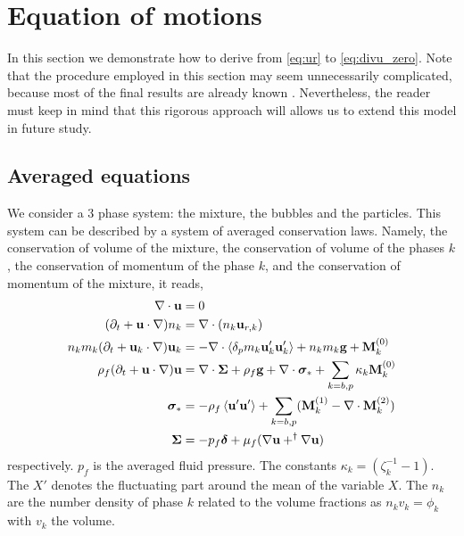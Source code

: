 \section{Equation of motions}
\label{sec:averaged_equations}
In this section we demonstrate how to derive from \ref{eq:ur} to \ref{eq:divu_zero}. 
Note that the procedure employed in this section may seem unnecessarily complicated, because most of the final results are already known \citep{jackson2000}. 
Nevertheless, the reader must keep in mind that this rigorous approach will allows us to extend this model in future study. 

\subsection{Averaged equations}

We consider a 3 phase system: the mixture, the bubbles and the particles.
This system can be described by a system of averaged conservation laws.
Namely, the conservation of volume of the mixture, the conservation of volume of the phases $k$, the conservation of momentum of the phase $k$, and the conservation of momentum of the mixture, it reads, 
\begin{align}
    \div \textbf{u} &= 0\\
     (\pddt + \textbf{u} \cdot \grad) n_k &= \div (n_k \textbf{u}_{r,k})\\
    n_k m_k (\pddt + \textbf{u}_k \cdot \grad) \textbf{u}_k &= 
    - \div \pavg{m_k\textbf{u}_k'\textbf{u}_k'}+n_k m_k \textbf{g}
    +\textbf{M}_k^{(0)}
    \label{eq:u_k}
    \\
    \rho_f (\pddt + \textbf{u} \cdot \grad)\textbf{u}
    &= 
    \div\bm\Sigma
    + \rho_f \textbf{g}
    + \div \bm\sigma_*
    +\sum_{k=b,p} \kappa_k  \textbf{M}_k^{(0)}
    \label{eq:u_dt}\\
    \bm\sigma_* &= 
    - \rho_f \avg{\textbf{u}'\textbf{u}'}
    + \sum_{k=b,p} (\textbf{M}_k^{(1)}
    -\div \textbf{M}_k^{(2)})\\
    \bm\Sigma &= 
    - p_f \bm\delta + \mu_f (\grad \textbf{u}+ ^\dagger \grad \textbf{u})
\end{align}
respectively. 
$p_f$ is the averaged fluid pressure. 
The constants $\kappa_k = (\zeta_k^{-1}- 1)$. 
The $X'$ denotes the fluctuating part around the mean of the variable $X$. 
The $n_k$ are the number density of phase $k$ related to the volume fractions as $n_k v_k = \phi_k$ with $v_k$ the volume. 
